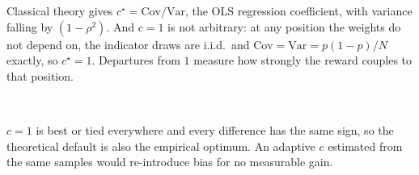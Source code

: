 \documentclass[11pt]{article}
\begin{document}
Classical theory gives $c^\star = \mathrm{Cov}/\mathrm{Var}$, the OLS regression
coefficient, with variance falling by $(1-\rho^2)$. And $c=1$ is not arbitrary:
at any position the weights do not depend on, the indicator draws are i.i.d.\ and
$\mathrm{Cov} = \mathrm{Var} = p(1-p)/N$ exactly, so $c^\star = 1$. Departures
from $1$ measure how strongly the reward couples to that position.

\begin{table}[htbp]
\centering
\small
{}
\\[0.4em] \begin{minipage}{0.92\textwidth}\footnotesize $c=1$ is best or tied everywhere and every difference has the same sign, so the theoretical default is also the empirical optimum. An adaptive $c$ estimated from the same samples would re-introduce bias for no measurable gain.\end{minipage}
\caption{QED: sweeping the control-variate coefficient, 15 runs per $c$. $c$ is not restricted to $[0,1]$ --- $\mathrm{Cov}/\mathrm{Var}$ can exceed $1$.}
\label{tab:conf-c-qed}
\end{table}
\end{document}
